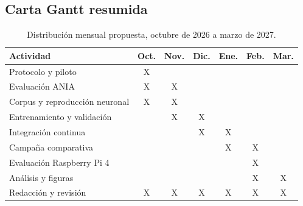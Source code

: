 \subsection{Carta Gantt resumida}
\begin{table}[H]
\centering\small
\renewcommand{\arraystretch}{1.2}
\begin{tabular}{|p{}|c|c|c|c|c|c|}
\hline
\textbf{Actividad}&\textbf{Oct.}&\textbf{Nov.}&\textbf{Dic.}&\textbf{Ene.}&\textbf{Feb.}&\textbf{Mar.}\\\hline
Protocolo y piloto&X&&&&&\\\hline
Evaluación ANIA&X&X&&&&\\\hline
Corpus y reproducción neuronal&X&X&&&&\\\hline
Entrenamiento y validación&&X&X&&&\\\hline
Integración continua&&&X&X&&\\\hline
Campaña comparativa&&&&X&X&\\\hline
Evaluación Raspberry Pi 4&&&&&X&\\\hline
Análisis y figuras&&&&&X&X\\\hline
Redacción y revisión&X&X&X&X&X&X\\\hline
\end{tabular}
\caption{Distribución mensual propuesta, octubre de 2026 a marzo de 2027.}
\end{table}
